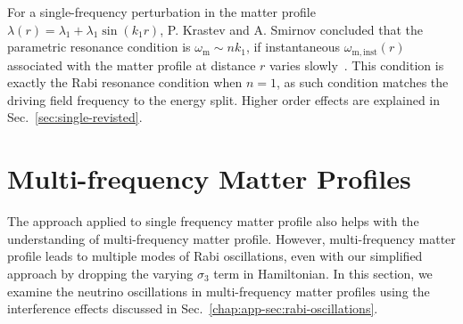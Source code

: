
For a single-frequency perturbation in the matter profile $\lambda(r) =\lambda_1 +  \lambda_1\sin(k_1 r)$, P. Krastev and A. Smirnov concluded that the parametric resonance condition is $\omega_{\mathrm{m}} \sim n k_1$, if instantaneous $\omega_{\mathrm{m,inst}}(r)$ associated with the matter profile at distance $r$ varies slowly~\cite{Krastev1989}. This condition is exactly the Rabi resonance condition when $n=1$, as such condition matches the driving field frequency to the energy split. Higher order effects are explained in Sec.~\ref{sec:single-revisted}.





\section{\label{chap:matter-sec:multiple-matter-frequencies}Multi-frequency Matter Profiles}


The approach applied to single frequency matter profile also helps with the understanding of multi-frequency matter profile. However, multi-frequency matter profile leads to multiple modes of Rabi oscillations, even with our simplified approach by dropping the varying $\sigma_3$ term in Hamiltonian. In this section, we examine the neutrino oscillations in multi-frequency matter profiles using the interference effects discussed in Sec.~\ref{chap:app-sec:rabi-oscillations}.








